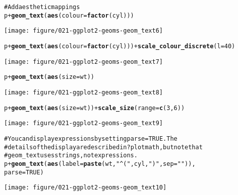 \documentclass[a4paper,titlepage]{tufte-handout}\usepackage{graphicx, color}
\makeatletter
\def\maxwidth{ %
  \ifdim\Gin@nat@width>\linewidth
    \linewidth
  \else
    \Gin@nat@width
  \fi
}
\newcommand{\hlfunctioncall}[1]{\textcolor[rgb]{0.501960784313725,0,0.329411764705882}{\textbf{#1}}}%
\newcommand{\hlstring}[1]{\textcolor[rgb]{0.6,0.6,1}{#1}}%
\newcommand{\hlcomment}[1]{\textcolor[rgb]{0.180392156862745,0.6,0.341176470588235}{#1}}%
\newenvironment{kframe}{%
 \def\at@end@of@kframe{}%
 \ifinner\ifhmode%
  \def\at@end@of@kframe{\end{minipage}}%
  \begin{minipage}{\columnwidth}%
 \fi\fi%
 \def\FrameCommand##1{\hskip\@totalleftmargin \hskip-\fboxsep
 \colorbox{shadecolor}{##1}\hskip-\fboxsep
     \hskip-\linewidth \hskip-\@totalleftmargin \hskip\columnwidth}%
 \MakeFramed {\advance\hsize-\width
   \@totalleftmargin\z@ \linewidth\hsize
   \@setminipage}}%
 {\par\unskip\endMakeFramed%
 \at@end@of@kframe}
\newenvironment{knitrout}{}{} %
\makeatother
\begin{document}
\begin{knitrout}
\begin{kframe}
\begin{alltt}
\hlcomment{# Add aesthetic mappings}
p + \hlfunctioncall{geom_text}(\hlfunctioncall{aes}(colour=\hlfunctioncall{factor}(cyl)))
\end{alltt}
\end{kframe}
\texttt{[image: figure/021-ggplot2-geoms-geom\_text6]} 
\begin{kframe}\begin{alltt}
p + \hlfunctioncall{geom_text}(\hlfunctioncall{aes}(colour=\hlfunctioncall{factor}(cyl))) + \hlfunctioncall{scale_colour_discrete}(l=40)
\end{alltt}
\end{kframe}
\texttt{[image: figure/021-ggplot2-geoms-geom\_text7]} 
\begin{kframe}\begin{alltt}

p + \hlfunctioncall{geom_text}(\hlfunctioncall{aes}(size=wt))
\end{alltt}
\end{kframe}
\texttt{[image: figure/021-ggplot2-geoms-geom\_text8]} 
\begin{kframe}\begin{alltt}
p + \hlfunctioncall{geom_text}(\hlfunctioncall{aes}(size=wt)) + \hlfunctioncall{scale_size}(range=\hlfunctioncall{c}(3,6))
\end{alltt}
\end{kframe}
\texttt{[image: figure/021-ggplot2-geoms-geom\_text9]} 
\begin{kframe}\begin{alltt}

\hlcomment{# You can display expressions by setting parse = TRUE.  The}
\hlcomment{# details of the display are described in ?plotmath, but note that}
\hlcomment{# geom_text uses strings, not expressions.}
p + \hlfunctioncall{geom_text}(\hlfunctioncall{aes}(label = \hlfunctioncall{paste}(wt, \hlstring{"^("}, cyl, \hlstring{")"}, sep = \hlstring{""})),
  parse = TRUE)
\end{alltt}
\end{kframe}
\texttt{[image: figure/021-ggplot2-geoms-geom\_text10]} 
\begin{kframe}\begin{alltt}


\end{alltt}
\end{kframe}
\end{knitrout}
\end{document}
